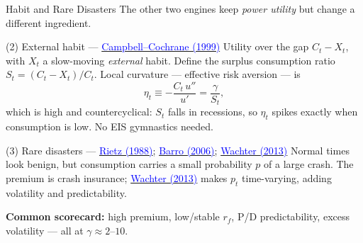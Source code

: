 \documentclass{beamer}
\begin{document}
\begin{frame}{Habit and Rare Disasters}
\justifying
The other two engines keep \emph{power utility} but change a different ingredient.
\begin{block}{(2) External habit --- \href{https://doi.org/10.1086/250059}{\textcolor{blue}{Campbell--Cochrane (1999)}}}
Utility over the gap $C_t-X_t$, with $X_t$ a slow-moving \emph{external} habit. Define the surplus consumption ratio $S_t=(C_t-X_t)/C_t$. Local curvature --- effective risk aversion --- is
\begin{equation*}
\eta_t \equiv -\frac{C_t\,u''}{u'}=\frac{\gamma}{S_t},
\end{equation*}
which is \alert{high and countercyclical}: $S_t$ falls in recessions, so $\eta_t$ spikes exactly when consumption is low. No EIS gymnastics needed.
\end{block}
\begin{block}{(3) Rare disasters --- \href{https://doi.org/10.1016/0304-3932(88)90172-9}{\textcolor{blue}{Rietz (1988)}}; \href{https://doi.org/10.1162/qjec.121.3.823}{\textcolor{blue}{Barro (2006)}}; \href{https://doi.org/10.1111/jofi.12018}{\textcolor{blue}{Wachter (2013)}}}
Normal times look benign, but consumption carries a small probability $p$ of a large crash. The premium is \alert{crash insurance}; \href{https://doi.org/10.1111/jofi.12018}{\textcolor{blue}{Wachter (2013)}} makes $p_t$ time-varying, adding volatility and predictability.
\end{block}
\centerline{\small\textbf{Common scorecard:} high premium, low/stable $r_f$, P/D predictability, excess volatility --- all at $\gamma\approx 2$--$10$.}
\end{frame}
\end{document}
